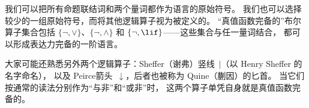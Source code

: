 \documentclass[../../../include/open-logic-section]{subfiles}
\begin{document}
\begin{explain}
我们可以把所有命题联结词和两个量词都作为语言的原始符号。
我们也可以选择较少的一组原始符号，而将其他逻辑算子视为被定义的。
“真值函数完备的”布尔算子集合包括 $\{ \lnot, \lor \}$、$\{ \lnot, \land \}$
和 $\{ \lnot, \lif\}$——这些集合与任一量词结合，
都可以形成表达力完备的一阶语言。

大家可能还熟悉另外两个逻辑算子：Sheffer（谢弗）竖线~$|$（以 Henry Sheffer 的名字命名），
以及 Peirce箭头~$\downarrow$，后者也被称为 Quine（蒯因）的匕首。
当它们按通常的读法分别作为“与非”和“或非”时，
这两个算子单凭自身就是真值函数完备的。
\end{explain}
\end{document}
